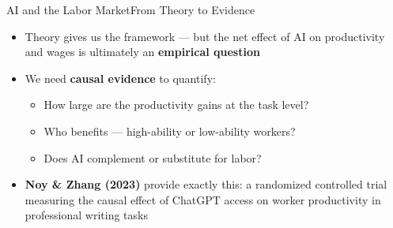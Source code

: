 \documentclass[hyperref={pdfpagelabels=false}]{beamer}
\begin{document}
\begin{frame}{AI and the Labor Market}{From Theory to Evidence}
	\begin{itemize}
		\item Theory gives us the framework --- but the net effect of AI on productivity and wages is ultimately an \textbf{empirical question}
		\vspace{0.4cm}
		\item We need \textbf{causal evidence} to quantify:
		\vspace{0.1cm}
		\begin{itemize}
			\item How large are the productivity gains at the task level?
			\vspace{0.1cm}
			\item Who benefits --- high-ability or low-ability workers?
			\vspace{0.1cm}
			\item Does AI complement or substitute for labor?
		\end{itemize}
		\vspace{0.4cm}
		\item[$\Rightarrow$] \textbf{Noy \& Zhang (2023)} provide exactly this: a randomized controlled trial measuring the causal effect of ChatGPT access on worker productivity in professional writing tasks
	\end{itemize}
\end{frame}
\end{document}
